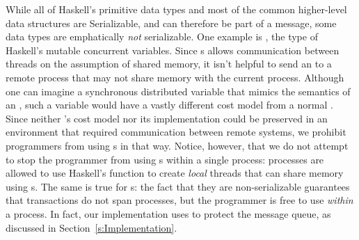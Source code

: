 \documentclass[preprint]{sigplanconf}
\begin{document}
While all of Haskell's primitive data types and most of the common higher-level data structures are \textsf{Serializable}, and can therefore be part of a message, some data types are emphatically \emph{not} serializable. 
One example is , the type of Haskell's mutable concurrent variables. Since s allows communication between threads on the assumption of shared memory, it isn't helpful to send an  to a remote process that may not share memory with the current process. 
Although one can imagine a synchronous distributed variable that mimics the semantics of an , such a variable would have a vastly different cost model from a normal . 
Since neither 's cost model nor its implementation could be preserved in an environment that required communication between remote systems, we  prohibit programmers from using s in that way.  
Notice, however, that we do not attempt to stop the programmer from using s within a single process: processes are allowed to use Haskell's  function to create \emph{local} threads that can share memory using s.
The same is true for s: the fact that they are non-serializable guarantees that  transactions 
do not span processes, but the programmer is free to use  \emph{within} a process.  
In fact, our implementation uses  to protect the message queue, as discussed in Section~\ref{s:Implementation}.



\end{document}
